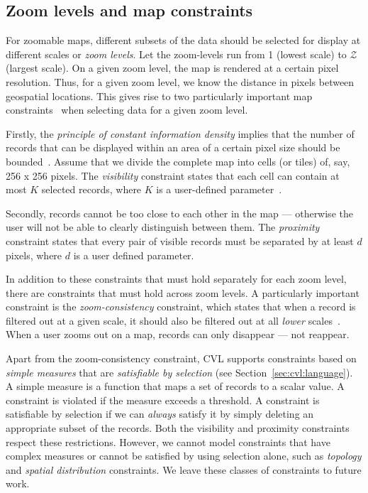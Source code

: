 \documentclass[11pt, oneside]{report}
\begin{document}
{\subsection{Zoom levels and map constraints}
\label{sec:cvl:constraints}
For zoomable maps, different subsets of the data should be selected for display at different scales or \emph{zoom levels}. Let the zoom-levels run from 1 (lowest scale) to $\mathcal{Z}$ (largest scale). On a given zoom level, the map is rendered at a certain pixel resolution. Thus, for a given zoom level, we know the distance in pixels between geospatial locations. This gives rise to two particularly important map constraints~\cite{harrie2007modelling} when selecting data for a given zoom level.

Firstly, the \emph{principle of constant information density} implies that the number of records that can be displayed within an area of a certain pixel size should be bounded~\cite{topfer1966principles}. Assume that we divide the complete map into cells (or tiles) of, say, 256 x 256 pixels. The \emph{visibility} constraint states that each cell can contain at most $K$ selected records, where $K$ is a user-defined parameter~\cite{sarma2012fusiontables}.

Secondly, records cannot be too close to each other in the map --- otherwise the user will not be able to clearly distinguish between them. The \emph{proximity} constraint states that every pair of visible records must be separated by at least $d$ pixels, where $d$ is a user defined parameter.

In addition to these constraints that must hold separately for each zoom level, there are constraints that must hold across zoom levels. A particularly important constraint is the \emph{zoom-consistency} constraint, which states that when a record is filtered out at a given scale, it should also be filtered out at all \emph{lower} scales~\cite{sarma2012fusiontables}. When a user zooms out on a map, records can only disappear --- not reappear.

Apart from the zoom-consistency constraint, CVL supports constraints based on \emph{simple measures} that are \emph{satisfiable by selection} (see Section~\ref{sec:cvl:language}). A simple measure is a function that maps a set of records to a scalar value. A constraint is violated if the measure exceeds a threshold. A constraint is satisfiable by selection if we can \emph{always} satisfy it by simply deleting an appropriate subset of the records. Both the visibility and proximity constraints respect these restrictions. However, we cannot model constraints that have complex measures or cannot be satisfied by using selection alone, such as \emph{topology} and \emph{spatial distribution} constraints. We leave these classes of constraints to future work.

}
\end{document}

